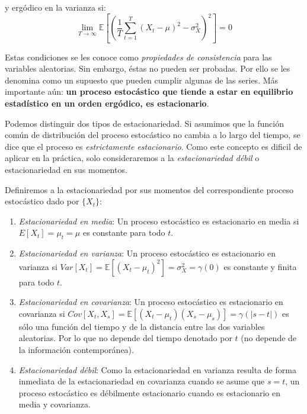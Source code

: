 \documentclass[
]{book}
\begin{document}
y ergódico en la varianza si:
\begin{equation}
    \displaystyle\lim_{T \to \infty}{\mathbb{E} \left[ \left( \frac{1}{T} \sum^{T}_{t = 1} (X_t - \mu) ^2 - \sigma^2_X \right) ^2 \right]} = 0
    \label{eq:LIM2}
\end{equation}

Estas condiciones se les conoce como \emph{propiedades de consistencia} para las variables aleatorias. Sin embargo, éstas no pueden ser probadas. Por ello se les denomina como un supuesto que pueden cumplir algunas de las series. Más importante aún: \textbf{un proceso estocástico que tiende a estar en equilibrio estadístico en un orden ergódico, es estacionario}.

Podemos distinguir dos tipos de estacionariedad. Si asumimos que la función común de distribución del proceso estocástico no cambia a lo largo del tiempo, se dice que el proceso es \emph{estrictamente estacionario}. Como este concepto es dificil de aplicar en la práctica, solo consideraremos a la \emph{estacionariedad débil} o estacionariedad en sus momentos.

Definiremos a la estacionariedad por sus momentos del correspondiente proceso estocástico dado por \(\{X_t\}\):

\begin{enumerate}
\def\labelenumi{\arabic{enumi}.}
\item
  \emph{Estacionariedad en media}: Un proceso estocástico es estacionario en media si \(E[X_t] = \mu_t = \mu\) es constante para todo \(t\).
\item
  \emph{Estacionariedad en varianza}: Un proceso estocástico es estacionario en varianza si \(Var[X_t] = \mathbb{E}[(X_t - \mu_t)^2] = \sigma^2_X = \gamma(0)\) es constante y finita para todo \(t\).
\item
  \emph{Estacionariedad en covarianza}: Un proceso estocástico es estacionario en covarianza si \(Cov[X_t,X_s] = \mathbb{E}[(X_t - \mu_t)(X_s - \mu_s)] = \gamma(|s-t|)\) es sólo una función del tiempo y de la distancia entre las dos variables aleatorias. Por lo que no depende del tiempo denotado por \(t\) (no depende de la información contemporánea).
\item
  \emph{Estacionariedad débil}: Como la estacionariedad en varianza resulta de forma inmediata de la estacionariedad en covarianza cuando se asume que \(s = t\), un proceso estocástico es débilmente estacionario cuando es estacionario en media y covarianza.
\end{enumerate}
\end{document}

